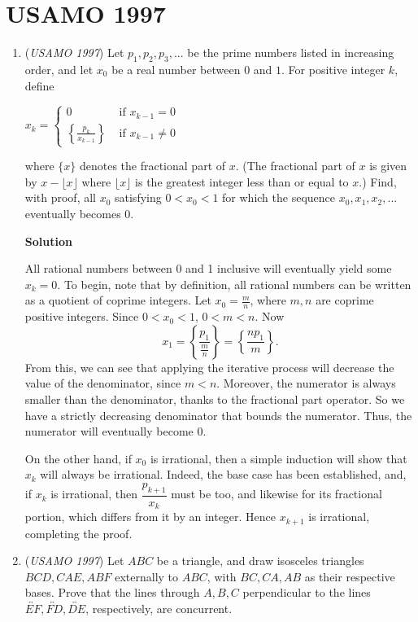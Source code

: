 \section{USAMO 1997}
        \begin{enumerate}
        	\item (\textit{USAMO 1997}) Let $p_1,p_2,p_3,...$ be the prime numbers listed in increasing order, and let $x_0$ be a real number between $0$ and $1$. For positive integer $k$, define


 $x_{k}=\begin{cases}0&\text{ if }x_{k-1}=0\\ \left\{\frac{p_{k}}{x_{k-1}}\right\}&\text{ if }x_{k-1}\ne0\end{cases}$


 where $\{x\}$ denotes the fractional part of $x$. (The fractional part of $x$ is given by $x-\lfloor{x}\rfloor$ where $\lfloor{x}\rfloor$ is the greatest integer less than or equal to $x$.) Find, with proof, all $x_0$ satisfying $0<x_0<1$ for which the sequence $x_0,x_1,x_2,...$ eventually becomes $0$.


 



\textbf{Solution}

All rational numbers between 0 and 1 inclusive will eventually yield some $x_k = 0$. To begin, note that by definition, all rational numbers can be written as a quotient of coprime integers. Let $x_0 = \frac{m}{n}$, where $m,n$ are coprime positive integers. Since $0<x_0<1$, $0<m<n$. Now 
 \[x_1 = \left\{\frac{p_1}{\frac{m}{n}}\right\}=\left\{\frac{np_1}{m}\right\}.\] From this, we can see that applying the iterative process will decrease the value of the denominator, since $m<n$. Moreover, the numerator is always smaller than the denominator, thanks to the fractional part operator. So we have a strictly decreasing denominator that bounds the numerator. Thus, the numerator will eventually become 0.

 On the other hand, if $x_0$ is irrational, then a simple induction will show that $x_k$ will always be irrational. Indeed, the base case has been established, and, if $x_k$ is irrational, then $\dfrac{p_{k+1}}{x_k}$ must be too, and likewise for its fractional portion, which differs from it by an integer. Hence $x_{k+1}$ is irrational, completing the proof.

 


	\item (\textit{USAMO 1997}) Let $ABC$ be a triangle, and draw isosceles triangles $BCD, CAE, ABF$ externally to $ABC$, with $BC, CA, AB$ as their respective bases. Prove that the lines through $A,B,C$ perpendicular to the lines $\overleftrightarrow{EF},\overleftrightarrow{FD},\overleftrightarrow{DE}$, respectively, are concurrent.



\end{enumerate}
